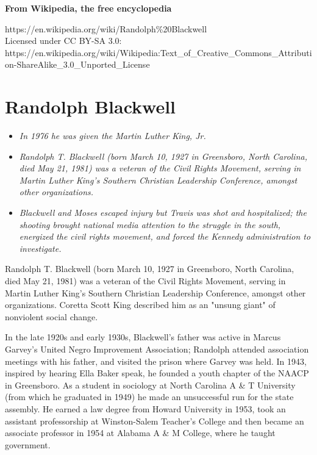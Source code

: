\textbf{From Wikipedia, the free encyclopedia}

https://en.wikipedia.org/wiki/Randolph\%20Blackwell\\
Licensed under CC BY-SA 3.0:\\
https://en.wikipedia.org/wiki/Wikipedia:Text\_of\_Creative\_Commons\_Attribution-ShareAlike\_3.0\_Unported\_License

\section{Randolph Blackwell}\label{randolph-blackwell}

\begin{itemize}
\item
  \emph{In 1976 he was given the Martin Luther King, Jr.}
\item
  \emph{Randolph T. Blackwell (born March 10, 1927 in Greensboro, North
  Carolina, died May 21, 1981) was a veteran of the Civil Rights
  Movement, serving in Martin Luther King's Southern Christian
  Leadership Conference, amongst other organizations.}
\item
  \emph{Blackwell and Moses escaped injury but Travis was shot and
  hospitalized; the shooting brought national media attention to the
  struggle in the south, energized the civil rights movement, and forced
  the Kennedy administration to investigate.}
\end{itemize}

Randolph T. Blackwell (born March 10, 1927 in Greensboro, North
Carolina, died May 21, 1981) was a veteran of the Civil Rights Movement,
serving in Martin Luther King's Southern Christian Leadership
Conference, amongst other organizations. Coretta Scott King described
him as an "unsung giant" of nonviolent social change.

In the late 1920s and early 1930s, Blackwell's father was active in
Marcus Garvey's United Negro Improvement Association; Randolph attended
association meetings with his father, and visited the prison where
Garvey was held. In 1943, inspired by hearing Ella Baker speak, he
founded a youth chapter of the NAACP in Greensboro. As a student in
sociology at North Carolina A \& T University (from which he graduated
in 1949) he made an unsuccessful run for the state assembly. He earned a
law degree from Howard University in 1953, took an assistant
professorship at Winston-Salem Teacher's College and then became an
associate professor in 1954 at Alabama A \& M College, where he taught
government.

